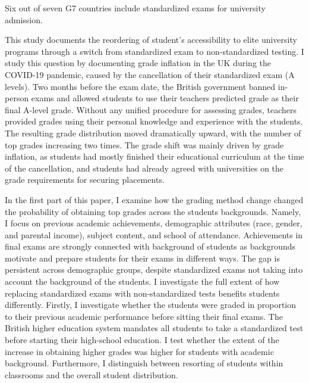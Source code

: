 Six out of seven G7 countries include standardized exams for university admission. 

This study documents the reordering of student's accessibility to elite university programs through a switch from standardized exam to non-standardized testing. I study this question by documenting grade inflation in the UK during the COVID-19 pandemic, caused by the cancellation of their standardized exam (A levels). Two months before the exam date, the British government banned in-person exams and allowed students to use their teachers predicted grade as their final A-level grade. Without any unified procedure for assessing grades, teachers provided grades using their personal knowledge and experience with the students. The resulting grade distribution moved dramatically upward, with the number of top grades increasing two times. The grade shift was mainly driven by grade inflation, as students had mostly finished their educational curriculum at the time of the cancellation, and students had already agreed with universities on the grade requirements for securing placements. 

In the first part of this paper, I examine how the grading method change changed the probability of obtaining top grades across the students backgrounds. Namely, I focus on previous academic achievements, demographic attributes (race, gender, and parental income), subject content, and school of attendance. Achievements in final exams are strongly connected with background of students as backgrounds motivate and prepare students for their exams in different ways. The gap is persistent across demographic groups, despite standardized exams not taking into account the background of the students. I investigate the full extent of how replacing standardized exams with non-standardized tests benefits students differently.  Firstly, I investigate whether the students were graded in proportion to their previous academic performance before sitting their final exams. The British higher education system mandates all students to take a standardized test before starting their high-school education. I test whether the extent of the increase in obtaining higher grades was higher for students with academic background. Furthermore, I distinguish between resorting of students within classrooms and the overall student distribution.  

